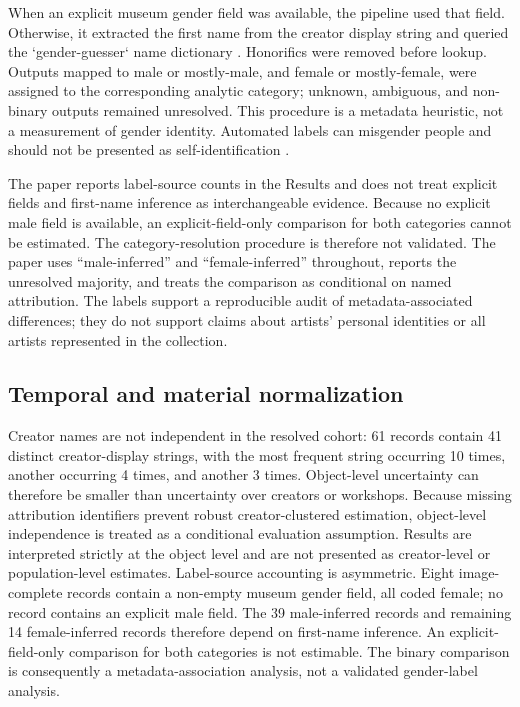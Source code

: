 \documentclass[pdflatex,sn-basic,Numbered]{sn-jnl}
\begin{document}
When an explicit museum gender field was available, the pipeline used that field. Otherwise, it extracted the first name from the creator display string and queried the `gender-guesser` name dictionary \cite{gender_guesser}. Honorifics were removed before lookup. Outputs mapped to male or mostly-male, and female or mostly-female, were assigned to the corresponding analytic category; unknown, ambiguous, and non-binary outputs remained unresolved. This procedure is a metadata heuristic, not a measurement of gender identity. Automated labels can misgender people and should not be presented as self-identification \cite{keyes2018misgendering}.

The paper reports label-source counts in the Results and does not treat explicit fields and first-name inference as interchangeable evidence. Because no explicit male field is available, an explicit-field-only comparison for both categories cannot be estimated. The category-resolution procedure is therefore not validated. The paper uses ``male-inferred'' and ``female-inferred'' throughout, reports the unresolved majority, and treats the comparison as conditional on named attribution. The labels support a reproducible audit of metadata-associated differences; they do not support claims about artists' personal identities or all artists represented in the collection.

\subsection{Temporal and material normalization}
Creator names are not independent in the resolved cohort: 61 records contain 41 distinct creator-display strings, with the most frequent string occurring 10 times, another occurring 4 times, and another 3 times. Object-level uncertainty can therefore be smaller than uncertainty over creators or workshops. Because missing attribution identifiers prevent robust creator-clustered estimation, object-level independence is treated as a conditional evaluation assumption. Results are interpreted strictly at the object level and are not presented as creator-level or population-level estimates.
Label-source accounting is asymmetric. Eight image-complete records contain a non-empty museum gender field, all coded female; no record contains an explicit male field. The 39 male-inferred records and remaining 14 female-inferred records therefore depend on first-name inference. An explicit-field-only comparison for both categories is not estimable. The binary comparison is consequently a metadata-association analysis, not a validated gender-label analysis.
\end{document}
